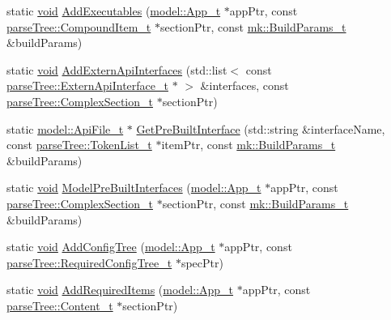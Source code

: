 \begin{DoxyCompactItemize}
\item 
static \hyperlink{_t_e_m_p_l_a_t_e__cdef_8h_ac9c84fa68bbad002983e35ce3663c686}{void} \hyperlink{namespacemodeller_acea8cb212513a4cc86988336fe9275d4}{Add\+Executables} (\hyperlink{structmodel_1_1_app__t}{model\+::\+App\+\_\+t} $\ast$app\+Ptr, const \hyperlink{structparse_tree_1_1_compound_item__t}{parse\+Tree\+::\+Compound\+Item\+\_\+t} $\ast$section\+Ptr, const \hyperlink{structmk_1_1_build_params__t}{mk\+::\+Build\+Params\+\_\+t} \&build\+Params)
\item 
static \hyperlink{_t_e_m_p_l_a_t_e__cdef_8h_ac9c84fa68bbad002983e35ce3663c686}{void} \hyperlink{namespacemodeller_a2362741ce74dfc90fa2816b8c65da26c}{Add\+Extern\+Api\+Interfaces} (std\+::list$<$ const \hyperlink{structparse_tree_1_1_extern_api_interface__t}{parse\+Tree\+::\+Extern\+Api\+Interface\+\_\+t} $\ast$ $>$ \&interfaces, const \hyperlink{structparse_tree_1_1_complex_section__t}{parse\+Tree\+::\+Complex\+Section\+\_\+t} $\ast$section\+Ptr)
\item 
static \hyperlink{structmodel_1_1_api_file__t}{model\+::\+Api\+File\+\_\+t} $\ast$ \hyperlink{namespacemodeller_a4ad4cdd34c5a3bf56d6b4f800879cd5f}{Get\+Pre\+Built\+Interface} (std\+::string \&interface\+Name, const \hyperlink{structparse_tree_1_1_token_list__t}{parse\+Tree\+::\+Token\+List\+\_\+t} $\ast$item\+Ptr, const \hyperlink{structmk_1_1_build_params__t}{mk\+::\+Build\+Params\+\_\+t} \&build\+Params)
\item 
static \hyperlink{_t_e_m_p_l_a_t_e__cdef_8h_ac9c84fa68bbad002983e35ce3663c686}{void} \hyperlink{namespacemodeller_ac528d9e9b72706493608a55e16c42904}{Model\+Pre\+Built\+Interfaces} (\hyperlink{structmodel_1_1_app__t}{model\+::\+App\+\_\+t} $\ast$app\+Ptr, const \hyperlink{structparse_tree_1_1_complex_section__t}{parse\+Tree\+::\+Complex\+Section\+\_\+t} $\ast$section\+Ptr, const \hyperlink{structmk_1_1_build_params__t}{mk\+::\+Build\+Params\+\_\+t} \&build\+Params)
\item 
static \hyperlink{_t_e_m_p_l_a_t_e__cdef_8h_ac9c84fa68bbad002983e35ce3663c686}{void} \hyperlink{namespacemodeller_a5be09245e3666672545e992307ea08ef}{Add\+Config\+Tree} (\hyperlink{structmodel_1_1_app__t}{model\+::\+App\+\_\+t} $\ast$app\+Ptr, const \hyperlink{structparse_tree_1_1_required_config_tree__t}{parse\+Tree\+::\+Required\+Config\+Tree\+\_\+t} $\ast$spec\+Ptr)
\item 
static \hyperlink{_t_e_m_p_l_a_t_e__cdef_8h_ac9c84fa68bbad002983e35ce3663c686}{void} \hyperlink{namespacemodeller_a0c9fb4e2bbe087f6788e03455d0aa555}{Add\+Required\+Items} (\hyperlink{structmodel_1_1_app__t}{model\+::\+App\+\_\+t} $\ast$app\+Ptr, const \hyperlink{structparse_tree_1_1_content__t}{parse\+Tree\+::\+Content\+\_\+t} $\ast$section\+Ptr)

\end{DoxyCompactItemize}
